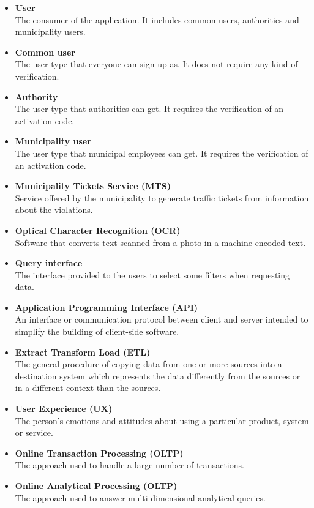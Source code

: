 \documentclass[./main.tex]{subfiles}
\begin{document}
\begin{itemize}
\item
  \textbf{User}\\
  The consumer of the application. It includes common users, authorities
  and municipality users.
\item
  \textbf{Common user}\\
  The user type that everyone can sign up as. It does not require any
  kind of verification.
\item
  \textbf{Authority}\\
  The user type that authorities can get. It requires the verification
  of an activation code.
\item
  \textbf{Municipality user}\\
  The user type that municipal employees can get. It requires the
  verification of an activation code.
\item
  \textbf{Municipality Tickets Service (MTS)}\\
  Service offered by the municipality to generate traffic tickets from
  information about the violations.
\item
  \textbf{Optical Character Recognition (OCR)}\\
  Software that converts text scanned from a photo in a machine-encoded
  text.
\item
  \textbf{Query interface}\\
  The interface provided to the users to select some filters when
  requesting data.
\item
  \textbf{Application Programming Interface (API)}\\
  An interface or communication protocol between client and server
  intended to simplify the building of client-side software.
\item
  \textbf{Extract Transform Load (ETL)}\\
  The general procedure of copying data from one or more sources into a
  destination system which represents the data differently from the
  sources or in a different context than the sources.
\item
  \textbf{User Experience (UX)}\\
  The person's emotions and attitudes about using a particular product, system
  or service.
\item
  \textbf{Online Transaction Processing (OLTP)}\\
  The approach used to handle a large number of transactions.
\item
  \textbf{Online Analytical Processing (OLTP)}\\
  The approach used to answer multi-dimensional analytical queries.
\end{itemize}
\end{document}
